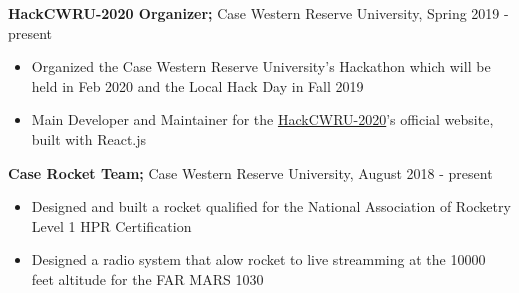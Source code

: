 \documentclass[a4paper,11pt]{article}
\begin{document}
\begin{flushleft}
	
	\textbf{HackCWRU-2020 Organizer; } Case Western Reserve University, Spring 2019 - 
	present
	\vspace{-\topsep}
	\begin{itemize}
		\setlength{\parskip}{0pt}
		\setlength{\itemsep}{0pt plus 1pt}
		\item Organized the Case Western Reserve University's Hackathon which will be held in Feb 2020 and the Local Hack Day in Fall 2019 \\
		\item Main Developer and Maintainer for the \href{https://hackcwru.github.io/HackCWRU2020-Website/}{HackCWRU-2020}'s official website, built with React.js
	\end{itemize}

	\textbf{Case Rocket Team; } Case Western Reserve University, August 2018 - present
	\vspace{-\topsep}
	\begin{itemize}
		\setlength{\parskip}{0pt}
		\setlength{\itemsep}{0pt plus 1pt}
		\item Designed and built a rocket qualified for the National Association of Rocketry Level 1 HPR Certification
		\item Designed a radio system that alow rocket to live streamming at the 10000 feet altitude for the FAR MARS 1030
	\end{itemize}
	
\vspace{-\topsep}
\end{flushleft} 
\end{document}
